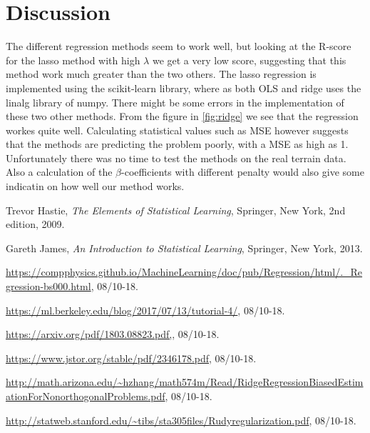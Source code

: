 \documentclass[a4paper,12pt, english]{article}
\begin{document}
\section*{Discussion}

The different regression methods seem to work well, but looking at the R-score for the lasso method with high $\lambda$ we get a very low score, suggesting that this method work much greater than the two others. The lasso regression is implemented using the scikit-learn library, where as both OLS and ridge uses the linalg library of numpy. There might be some errors in the implementation of these two other methods.
From the figure in \ref{fig:ridge} we see that the regression workes quite well. Calculating statistical values such as MSE however suggests that the methods are predicting the problem poorly, with a MSE as high as 1.\\
Unfortunately there was no time to test the methods on the real terrain data. \\
Also a calculation of the $\beta$-coefficients with different penalty would also give some indicatin on how well our method works. \\


\newpage

\begin{thebibliography}{9}

  Trevor Hastie,
  \textit{The Elements of Statistical Learning},
  Springer, New York,
  2nd edition,
  2009.

  Gareth James, 
  \textit{An Introduction to Statistical Learning},
  Springer, New York,
  2013.
  
  \url{https://compphysics.github.io/MachineLearning/doc/pub/Regression/html/._Regression-bs000.html}, 08/10-18.
  
  \url{https://ml.berkeley.edu/blog/2017/07/13/tutorial-4/}, 08/10-18.
  
  \url{https://arxiv.org/pdf/1803.08823.pdf,}, 08/10-18.
  
  \url{https://www.jstor.org/stable/pdf/2346178.pdf}, 08/10-18.
 
  \url{http://math.arizona.edu/~hzhang/math574m/Read/RidgeRegressionBiasedEstimationForNonorthogonalProblems.pdf}, 08/10-18.
  
  \url{http://statweb.stanford.edu/~tibs/sta305files/Rudyregularization.pdf}, 08/10-18.
  

\end{thebibliography}
\end{document}
